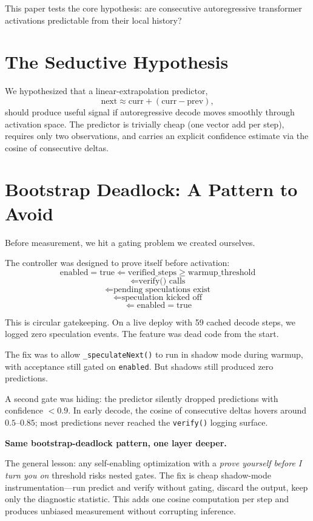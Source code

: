 \documentclass[11pt,letterpaper]{article}
\begin{document}
This paper tests the core hypothesis: are consecutive autoregressive transformer activations predictable from their local history?

\section{The Seductive Hypothesis}

We hypothesized that a linear-extrapolation predictor,
\[\text{next} \approx \text{curr} + (\text{curr} - \text{prev}),\]
should produce useful signal if autoregressive decode moves smoothly through activation space. The predictor is trivially cheap (one vector add per step), requires only two observations, and carries an explicit confidence estimate via the cosine of consecutive deltas.

\section{Bootstrap Deadlock: A Pattern to Avoid}

Before measurement, we hit a gating problem we created ourselves.

The controller was designed to prove itself before activation:
\[\text{enabled} = \text{true} \Leftarrow \text{verified\_steps} \geq \text{warmup\_threshold}\]
\[\Leftarrow \text{verify()} \text{ calls}\]
\[\Leftarrow \text{pending speculations exist}\]
\[\Leftarrow \text{speculation kicked off}\]
\[\Leftarrow \text{enabled} = \text{true}\]

This is circular gatekeeping. On a live deploy with 59 cached decode steps, we logged zero speculation events. The feature was dead code from the start.

The fix was to allow \texttt{\_speculateNext()} to run in shadow mode during warmup, with acceptance still gated on \texttt{enabled}. But shadows still produced zero predictions.

A second gate was hiding: the predictor silently dropped predictions with confidence $< 0.9$. In early decode, the cosine of consecutive deltas hovers around $0.5$–$0.85$; most predictions never reached the \texttt{verify()} logging surface.

\textbf{Same bootstrap-deadlock pattern, one layer deeper.}

The general lesson: any self-enabling optimization with a \emph{prove yourself before I turn you on} threshold risks nested gates. The fix is cheap shadow-mode instrumentation—run predict and verify without gating, discard the output, keep only the diagnostic statistic. This adds one cosine computation per step and produces unbiased measurement without corrupting inference.
\end{document}

